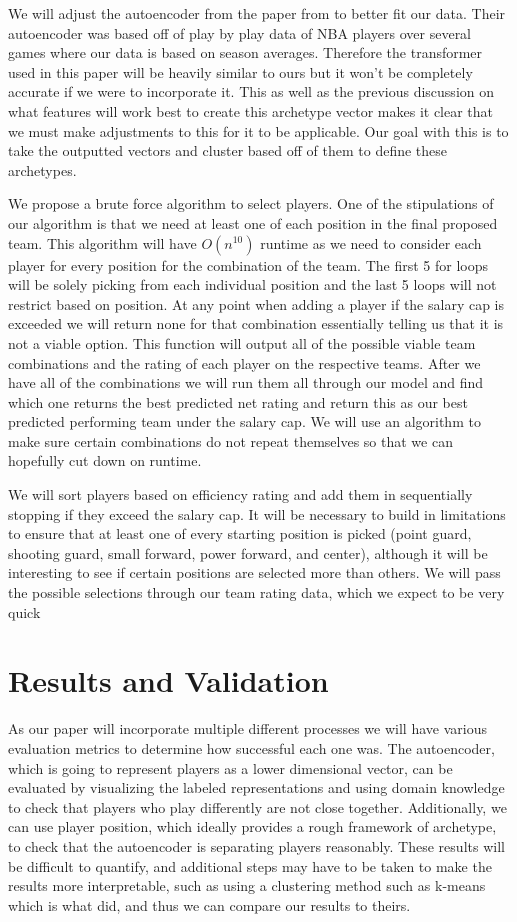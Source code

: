 \documentclass[12pt, letterpaper, titlepage]{article}
\begin{document}
We will adjust the autoencoder from the paper from \citet{guan} to better fit our data. Their autoencoder was based off of play by play data of NBA players over several games where our data is based on season averages. Therefore the transformer used in this paper will be heavily similar to ours but it won't be completely accurate if we were to incorporate it. This as well as the previous discussion on what features will work best to create this archetype vector makes it clear that we must make adjustments to this for it to be applicable. Our goal with this is to take the outputted vectors and cluster based off of them to define these archetypes.

We propose a brute force algorithm to select players. One of the stipulations of our algorithm is that we need at least one of each position in the final proposed team. This algorithm will have $O(n^{10})$ runtime as we need to consider each player for every position for the combination of the team. The first 5 for loops will be solely picking from each individual position and the last 5 loops will not restrict based on position. At any point when adding a player if the salary cap is exceeded we will return none for that combination essentially telling us that it is not a viable option. This function will output all of the possible viable team combinations and the rating of each player on the respective teams. After we have all of the combinations we will run them all through our model and find which one returns the best predicted net rating and return this as our best predicted performing team under the salary cap. We will use an algorithm to make sure certain combinations do not repeat themselves so that we can hopefully cut down on runtime.

We will sort players based on efficiency rating and add them in sequentially stopping if they exceed the salary cap. It will be necessary to build in limitations to ensure that at least one of every starting position is picked (point guard, shooting guard, small forward, power forward, and center), although it will be interesting to see if certain positions are selected more than others. We will pass the possible selections through our team rating data, which we expect to be very quick


\section{Results and Validation}
As our paper will incorporate multiple different processes we will have various evaluation metrics to determine how successful each one was. The autoencoder, which is going to represent players as a lower dimensional vector, can be evaluated by visualizing the labeled representations and using domain knowledge to check that players who play differently are not close together. Additionally, we can use player position, which ideally provides a rough framework of archetype, to check that the autoencoder is separating players reasonably. These results will be difficult to quantify, and additional steps may have to be taken to make the results more interpretable, such as using a clustering method such as k-means which is what \citet{guan} did, and thus we can compare our results to theirs.
\end{document}
